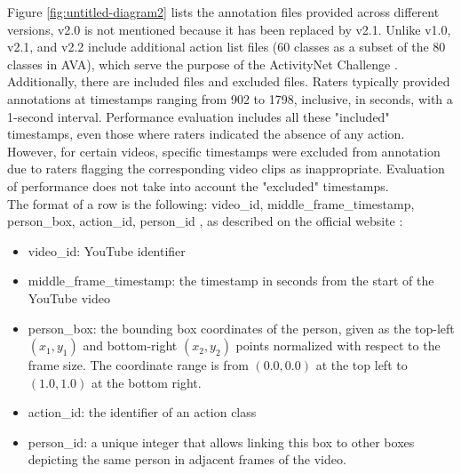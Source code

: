 \documentclass[10pt,onecolumn,letterpaper]{article}
\begin{document}
Figure \ref{fig:untitled-diagram2} lists the annotation files provided across different versions, v2.0 is not mentioned because it has been replaced by v2.1. Unlike v1.0, v2.1, and v2.2 include additional action list files (60 classes as a subset of the 80 classes in AVA), which serve the purpose of the ActivityNet Challenge \cite{ActivityNet}. Additionally, there are included files and excluded files. Raters typically provided annotations at timestamps ranging from 902 to 1798, inclusive, in seconds, with a 1-second interval. Performance evaluation includes all these "included" timestamps, even those where raters indicated the absence of any action. However, for certain videos, specific timestamps were excluded from annotation due to raters flagging the corresponding video clips as inappropriate. Evaluation of performance does not take into account the "excluded" timestamps.\\

The format of a row is the following: video\_id, middle\_frame\_timestamp, person\_box, action\_id, person\_id , as described on the official website :
\begin{itemize}
	\item video\_id: YouTube identifier
	\item middle\_frame\_timestamp: the timestamp in seconds from the start of the YouTube video
	\item person\_box: the bounding box coordinates of the person, given as the top-left $(x_1, y_1)$ and bottom-right $(x_2, y_2)$ points normalized with respect to the frame size. The coordinate range is from $(0.0, 0.0)$ at the top left to $(1.0, 1.0)$ at the bottom right.
	\item action\_id: the identifier of an action class
	\item person\_id: a unique integer that allows linking this box to other boxes depicting the same person in adjacent frames of the video.
\end{itemize}



\end{document}
